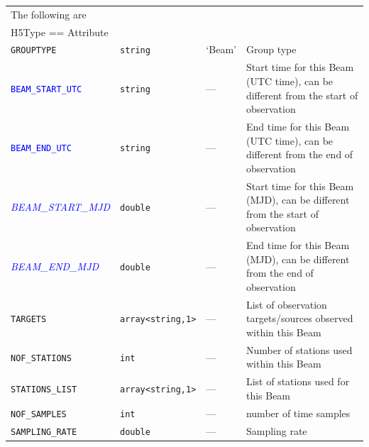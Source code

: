 \documentclass[a4paper,10pt,bibtotoc]{scrartcl}
\begin{document}
\tablelasttail{\hline}
\begin{supertabular}{|lllp{5.5cm}|}
  \hline
  \hline 
  \sc The following are & \sc & \sc &\\
  \sc H5Type == Attribute & \sc & \sc &\\
  \hline 
  \small{\verb|GROUPTYPE|}  & \verb|string| & `Beam' & Group type \\
  \textcolor{blue}{\texttt{BEAM\_START\_UTC}}  & \verb|string| & --- & Start time for this Beam (UTC time), can be different from the start of observation \\
  \textcolor{blue}{\texttt{BEAM\_END\_UTC}}  & \verb|string| & --- & End time for this Beam (UTC time), can be different from the end of observation \\
  \begin{scriptsize}\textcolor{blue}{\textit{BEAM\_START\_MJD}}\end{scriptsize}  & \verb|double| & --- & Start time for this Beam (MJD), can be different from the start of observation \\
  \begin{scriptsize}\textcolor{blue}{\textit{BEAM\_END\_MJD}}\end{scriptsize}  & \verb|double|  & --- & End time for this Beam (MJD), can be different from the end of observation \\
  \small{\verb|TARGETS|}   & \verb|array<string,1>| & --- & List of observation targets/sources observed within this Beam \\
  \small{\verb|NOF_STATIONS|}  & \verb|int|& --- & Number of stations used within this Beam \\
  \small{\verb|STATIONS_LIST|}  & \verb|array<string,1>| & --- & List of stations used for this Beam \\
    \verb|NOF_SAMPLES|  & \verb|int| & --- & number of time samples \\
    \verb|SAMPLING_RATE|     & \verb|double|  & --- & Sampling rate \\

\end{supertabular}
\end{document}

